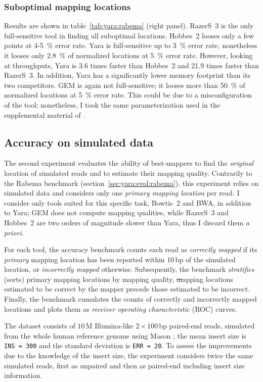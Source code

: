 \subsubsection{Suboptimal mapping locations}
Results are shown in table~\ref{tab:yara:rabema}  (right panel).
RazerS~3 is the only full-sensitive tool in finding all suboptimal locations.
Hobbes~2 looses only a few points at 4-5~\% error rate.
Yara is full-sensitive up to 3~\% error rate, nonetheless it looses only 2.8~\% of normalized locations at 5~\% error rate.
However, looking at throughputs, Yara is 3.6 times faster than Hobbes~2 and 21.9 times faster than RazerS~3.
In addition, Yara has a significantly lower memory footprint than its two competitors.
GEM is again not full-sensitive; it looses more than 50~\% of normalized locations at 5~\% error rate.
This could be due to a misconfiguration of the tool; nonetheless, I took the same parameterization used in the supplemental material of \citep{MarcoSola2012}.

\subsection{Accuracy on simulated data}
\label{sec:yara:eval:accuracy}

The second experiment evaluates the ability of best-mappers to find the \emph{original} location of simulated reads and to estimate their mapping quality.
Contrarily to the Rabema benchmark (section~\ref{sec:yara:eval:rabema}), this experiment relies on simulated data and considers only one \emph{primary mapping location} per read.
I consider only tools suited for this specific task, \ie Bowtie~2 and BWA, in addition to Yara; GEM does not compute mapping qualities, while RazerS~3 and Hobbes~2 are two orders of magnitude slower than Yara, thus I discard them \emph{a priori}.

For each tool, the accuracy benchmark counts each read as \emph{correctly mapped} if its \emph{primary} mapping location has been reported within $10\,\text{bp}$ of the simulated location, or \emph{incorrectly mapped} otherwise.
Subsequently, the benchmark \emph{stratifies} (\ie sorts) primary mapping locations by mapping quality, \st mapping locations estimated to be correct by the mapper precede those estimated to be incorrect.
Finally, the benchmark cumulates the counts of correctly and incorrectly mapped locations and plots them as \emph{receiver operating characteristic} (ROC) curves.

The dataset consists of $10\,\text{M}$ Illumina-like $2 \times 100\,\text{bp}$ paired-end reads, simulated from the whole human reference genome using Mason \citep{Holtgrewe2010}; the mean insert size is \texttt{INS = 300} and the standard deviation is \texttt{ERR = 20}.
To assess the improvements due to the knowledge of the insert size, the experiment considers twice the same simulated reads, first as unpaired and then as paired-end including insert size information.

